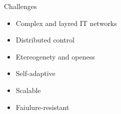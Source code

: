 \begin{frame}{Challenges}
  \begin{cardTiny}
    \begin{itemize}
      \item Complex and layred IT networks
      \item Distributed control
      \item Etereogenety and openess
    \end{itemize}
  \end{cardTiny}
  \begin{card}
    \begin{itemize}
      \item[\success{\faThumbsUp}] Self-adaptive
      \item[\success{\faThumbsUp}] Scalable
      \item[\success{\faThumbsUp}] Faiulure-resistant 
    \end{itemize}
  \end{card}
\end{frame}